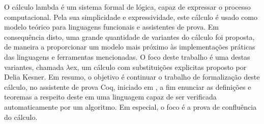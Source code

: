 O cálculo lambda é um sistema formal de lógica, capaz de expressar o processo computacional.
Pela sua simplicidade e expressividade, este cálculo é usado como modelo teórico
para linguagens funcionais e assistentes de prova. Em consequência disto, 
uma grande quantidade de variantes do cálculo foi proposta, de maneira a proporcionar
um modelo mais próximo às implementações práticas das linguagens e ferramentas mencionadas.
O foco deste trabalho é uma destas variantes, chamada $\lambda$ex, um cálculo com substituições explicitas proposto por Delia Kesner.
Em resumo, o objetivo é continuar o trabalho de formalização
deste cálculo, no assistente de prova Coq, iniciado em \cite{initial}, a fim enunciar as definições e teoremas a respeito
deste em uma linguagem capaz de ser verificada automaticamente por um algoritmo.
Em especial, o foco é a prova de confluência do cálculo.

